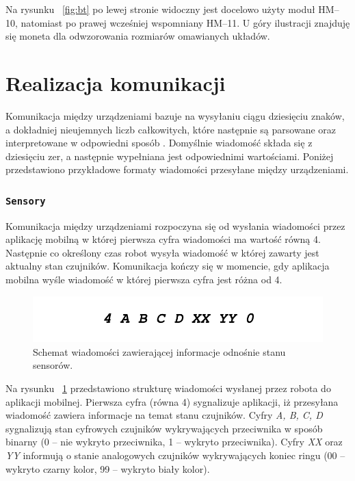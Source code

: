 Na rysunku ~\ref{fig:bt} po lewej stronie widoczny jest docelowo użyty moduł HM–10, natomiast po prawej wcześniej wspomniany HM–11. U góry ilustracji znajduję się moneta dla odwzorowania rozmiarów omawianych układów.

\section{Realizacja komunikacji}
Komunikacja między urządzeniami bazuje na wysyłaniu ciągu dziesięciu znaków, a dokładniej nieujemnych liczb całkowitych, które następnie są parsowane oraz interpretowane w odpowiedni sposób \cite{Forbot}. Domyślnie wiadomość składa się z dziesięciu zer, a następnie wypełniana jest odpowiednimi wartościami. Poniżej przedstawiono przykładowe formaty wiadomości przesyłane między urządzeniami.

 \subsubsection{\lstinline$Sensory$}
Komunikacja między urządzeniami rozpoczyna się od wysłania wiadomości przez aplikację mobilną w której pierwsza cyfra wiadomości ma wartość równą 4. Następnie co określony czas robot wysyła wiadomość w której zawarty jest aktualny stan czujników. Komunikacja kończy się w momencie, gdy aplikacja mobilna wyśle wiadomość w której pierwsza cyfra jest różna od 4.

\begin{figure}[H]
	\centering
		\includegraphics[width=0.75\linewidth]{pic03/sensors.pdf}
	\caption{Schemat wiadomości zawierającej informacje odnośnie stanu sensorów.}
	\label{fig:sensors_communication}	
\end{figure}

Na rysunku ~\ref{fig:sensors_communication} przedstawiono strukturę wiadomości wysłanej przez robota do aplikacji mobilnej. Pierwsza cyfra (równa 4) sygnalizuje aplikacji, iż przesyłana wiadomość zawiera informacje na temat stanu czujników. Cyfry \textit{A, B, C, D} sygnalizują stan cyfrowych czujników wykrywających przeciwnika w sposób binarny (0 – nie wykryto przeciwnika, 1 – wykryto przeciwnika). Cyfry \textit{XX} oraz \textit{YY} informują o stanie analogowych czujników wykrywających koniec ringu (00 – wykryto czarny kolor, 99 – wykryto biały kolor).

